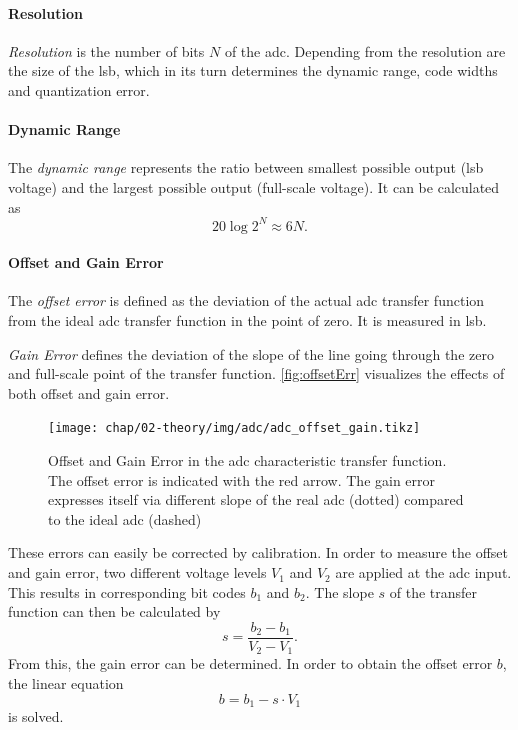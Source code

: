 \paragraph{Resolution}
\textit{Resolution} is the number of bits $N$ of the \gls{adc}.
Depending from the resolution are the size of the \gls{lsb}, which in its turn determines the dynamic range, code widths and quantization error.
\paragraph{Dynamic Range}
The \textit{dynamic range} represents the ratio between smallest possible output (\gls{lsb} voltage) and the largest possible output (full-scale voltage).
It can be calculated as
\begin{equation}
	20 \log 2^{N} \approx 6N.
\end{equation}

\paragraph{Offset and Gain Error}
The \textit{offset error} is defined as the deviation of the actual \gls{adc} transfer function from the ideal \gls{adc} transfer function in the point of zero. It is measured in \gls{lsb}. 

\textit{Gain Error} defines the deviation of the slope of the line going through the zero and full-scale point of the transfer function.
\autoref{fig:offsetErr} visualizes the effects of both offset and gain error. 
\begin{figure}[tb]
	\centering
	\texttt{[image: chap/02-theory/img/adc/adc\_offset\_gain.tikz]}
	\caption[Effects of Offset and Fain error in ADC]{Offset and Gain Error in the \gls{adc} characteristic transfer function. The offset error is indicated with the red arrow. The gain error expresses itself via different slope of the real \gls{adc} (dotted) compared to the ideal \gls{adc} (dashed)}
	\label{fig:offsetErr}
\end{figure}

These errors can easily be corrected by calibration. 
In order to measure the offset and gain error, two different voltage levels $V_1$ and $V_2$ are applied at the \gls{adc} input. 
This results in corresponding bit codes $b_1$ and $b_2$.
The slope $s$ of the transfer function can then be calculated by
\begin{equation}
	s = \frac{b_2 - b_1}{V_2 - V_1}.
\end{equation}
From this, the gain error can be determined.
In order to obtain the offset error $b$, the linear equation
\begin{equation}
	b = b_1 - s\cdot V_1
\end{equation}
is solved.

